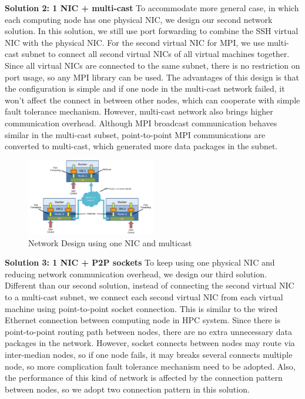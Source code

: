\textbf{Solution 2: 1 NIC + multi-cast}
To accommodate more general case, in which each computing node has one physical NIC, we design our second network solution. In this solution, we still use port forwarding to combine the SSH virtual NIC with the physical NIC. For the second virtual NIC for MPI, we use multi-cast subnet to connect all second virtual NICs of all virtual machines together. Since all virtual NICs are connected to the same subnet, there is no restriction on port usage, so any MPI library can be used. The advantages of this design is that the configuration is simple and if one node in the multi-cast network failed, it won't affect the connect in between other nodes, which can cooperate with simple fault tolerance mechanism. However, multi-cast network also brings higher communication overhead. Although MPI broadcast communication behaves similar in the multi-cast subset, point-to-point MPI communications are converted to multi-cast, which generated more data packages in the subnet.
\begin{figure}[h]
    \centering
    \caption{Network Design using one NIC and multicast}
    \label{mcast}
    \includegraphics[width=0.5\textwidth]{figures/mcast.pdf}
\end{figure}
 
\textbf{Solution 3: 1 NIC + P2P sockets}
To keep using one physical NIC and reducing network communication overhead, we design our third solution. Different than our second solution, instead of connecting the second virtual NIC to a multi-cast subnet, we connect each second virtual NIC from each virtual machine using point-to-point socket connection. This is similar to the wired Ethernet connection between computing node in HPC system. Since there is point-to-point routing path between nodes, there are no extra unnecessary data packages in the network. However, socket connects between nodes may route via inter-median nodes, so if one node fails, it may breaks several connects multiple node, so more complication fault tolerance mechanism need to be adopted. Also, the performance of this kind of network is affected by the connection pattern between nodes, so we adopt two connection pattern in this solution. 

